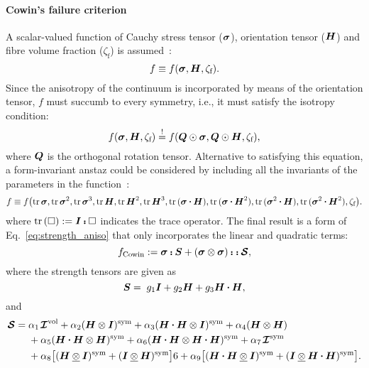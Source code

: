 	\paragraph{Cowin's failure criterion} 	A scalar-valued function of Cauchy stress tensor ($\tenb{\sigma}$), orientation tensor ($\tenb{H}$) and fibre volume fraction ($\zeta_\text{f}$) is assumed~\autocite{Cowin.1986}:
		\begin{equation}
			f\equiv f(\tenb{\sigma}, \tenb{H}, \zeta_\text{f}).
		\end{equation}
		Since the anisotropy of the continuum is incorporated by means of the orientation tensor, $f$ must succumb to every symmetry, i.e., it must satisfy the isotropy condition:
		\begin{equation}
			f(\tenb{\sigma}, \tenb{H}, \zeta_\text{f})\equimust f(\tenb{Q}\Rayleigh\tenb{\sigma}, \tenb{Q}\Rayleigh\tenb{H}, \zeta_\text{f}),
		\end{equation}
		where $\tenb{Q}$ is the orthogonal rotation tensor. Alternative to satisfying this equation, a form-invariant anstaz could be considered by including all the invariants of the parameters in the function~\autocite{Boehler.1987}:
		\begin{equation}
			f\equiv f\big(
			\tr{\tenb{\sigma}},\tr{\tenb{\sigma}^2},\tr{\tenb{\sigma}^3},
			\tr{\tenb{H}},\tr{\tenb{H}^2},\tr{\tenb{H}^3},
			\tr{(\tenb{\sigma}\scp\tenb{H})},\tr{(\tenb{\sigma}\scp\tenb{H}^2)},\tr{(\tenb{\sigma}^2\scp\tenb{H})},\tr{(\tenb{\sigma}^2\scp\tenb{H}^2)},\zeta_\text{f}\big).
		\end{equation}
		where $\tr{(\op)}\equidef\tenb{I}\dscp\op$ indicates the trace operator. The final result is a form of Eq.~\eqref{eq:strength_aniso} that only incorporates the linear and quadratic terms:
	\begin{equation}
		f_\text{Cowin}\equidef \tenb{\sigma}\dscp\tenb{S} + (\tenb{\sigma}\dyad\tenb{\sigma})\dscp\dscp\tend{S},
	\end{equation}	
	where the strength tensors are given as
	\begin{equation}
		\tenb{S} =\;g_1\unitb+g_2\tenb{H}+g_3\tenb{H}\scp\tenb{H},
	\end{equation}
	and
	\begin{alignat}{5}
	\nonumber 	\tend{S} =\;& \alpha_1 \unitd^\vol 
					+\alpha_2 (\tenb{H}\dyad\unitb)^\sym 
					+\alpha_3 (\tenb{H}\scp\tenb{H}\dyad\unitb)^\sym
					+\alpha_4 (\tenb{H}\dyad\tenb{H})\\\nonumber
	    			&+\alpha_5 (\tenb{H}\scp\tenb{H}\dyad\tenb{H})^\sym 
					+\alpha_6 (\tenb{H}\scp\tenb{H}\dyad\tenb{H}\scp\tenb{H})^\sym 
					+\alpha_7 \unitd^\sym\\
					&+\alpha_8 \big[(\tenb{H}\dyadu\unitb)^\sym + (\unitb\dyadu\tenb{H})^\sym\big]6
					+\alpha_9 \big[(\tenb{H}\scp\tenb{H}\dyadu\unitb)^\sym + (\unitb\dyadu\tenb{H}\scp\tenb{H})^\sym\big].
	\end{alignat}
